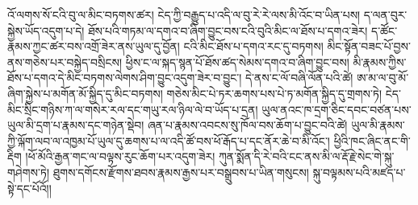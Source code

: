 \documentclass{article}
\begin{document}
འོ་ལགས་སོ་ངའི་བུ་ལ་མིང་བཏགས་ཚར། ངེད་ཀྱི་བརྒྱུད་པ་འདི་ལ་བུ་རེ་རེ་ལས་མི་འོང་བ་ཡིན་པས། ད་ལན་བུར་སྐྱེས་ཡོད་འདུག་པ་དེ། ཐོས་པའི་གཏམ་ལ་དགའ་བ་ཞིག་བྱུང་བས་ངའི་བུའི་མིང་ལ་ཐོས་པ་དགའ་ཟེར། ད་ཚོང་རྣམས་ཀྱང་ཚར་བས་འགྲོ་ཟེར་ནས་ཡུལ་དུ་བྱོན། ངའི་མིང་ཐོས་པ་དགའ་རང་དུ་བཏགས། མིང་སྟོན་བཟང་པོ་བྱས་ནས་གཅེས་པར་བསྐྱེད་བསྲིངས། ཕྱིས་ང་ལ་སྐད་སྙན་པོ་ཐོས་ཚད་སེམས་དགའ་བ་ཞིག་བྱུང་བས། མི་རྣམས་ཀྱིས་ཐོས་པ་དགའ་དེ་མིང་བཏགས་ལེགས་ཤིག་བྱུང་འདུག་ཟེར་བ་བྱུང་། དེ་ནས་ང་ལོ་བཞི་ལོན་པའི་ཚེ། ཨ་མ་ལ་བུ་མོ་ཞིག་སྐྱེས་པ་མགོན་མོ་སྐྱིད་དུ་མིང་བཏགས། གཅེས་མིང་པེ་ཏར་ཆགས་པས་པེ་ཏ་མགོན་སྐྱིད་དུ་གྲགས་ཏེ། ངེད་མིང་སྲིང་གཉིས་ཀ་ལ་གསེར་རལ་དང་གཡུ་རལ་ཉིལ་ལེ་བ་ཡོད་པ་དྲན། ཡུལ་ནའང་ཁ་དྲག་ཅིང་དབང་བཙན་པས་ཡུལ་མི་དྲག་པ་རྣམས་དང་གཉེན་སྡེབ། ཞན་པ་རྣམས་འབངས་སུ་ཁོལ་བས་ཆོག་པ་བྱུང་བའི་ཚེ། ཡུལ་མི་རྣམས་ཀྱི་ལྐོག་ལབ་ལ་འཁྱམ་པོ་ཡུལ་དུ་ཆགས་པ་ལ་འདི་ཚོ་བས་ཕོ་རྒོད་པ་དང་ནོར་ཆེ་བ་མི་འོང་། ཕྱིའི་ཁང་ཞིང་ནང་གི་རྡིག །ཕོ་མོའི་རྒྱན་གང་ལ་བལྟས་རུང་ཆོག་པར་འདུག་ཟེར། ཀུན་སྨོན་དི་རེ་བའི་ངང་ནས་མི་ལ་རྡོ་རྗེ་སེང་གེ་སྐུ་གཤེགས་ཏེ། ཐུགས་དགོངས་རྫོགས་ཐབས་རྣམས་རྒྱས་པར་བསྒྲུབས་པ་ཡིན་གསུངས། སྐུ་བལྟམས་པའི་མཛད་པ་སྟེ་དང་པོའོ།།
\end{document}
